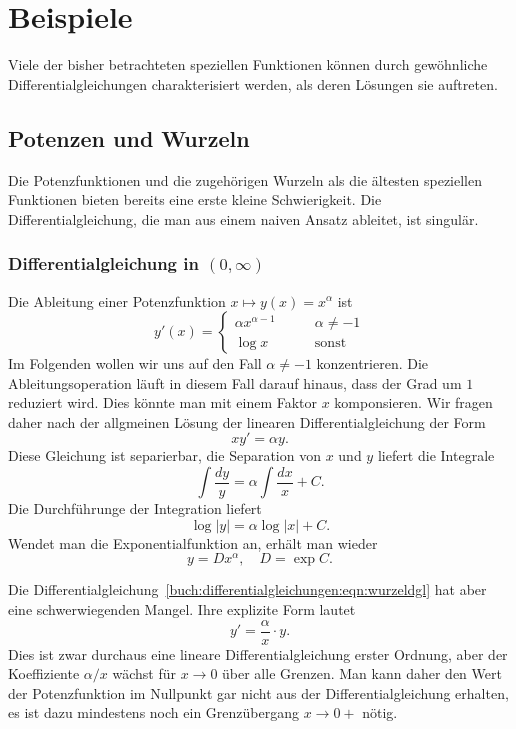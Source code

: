 %
%
%
\section{Beispiele
\label{buch:differentialgleichungen:section:beispiele}}
Viele der bisher betrachteten speziellen Funktionen können 
durch gewöhnliche Differentialgleichungen charakterisiert werden,
als deren Lösungen sie auftreten.

\subsection{Potenzen und Wurzeln
\label{buch:differentialgleichungen:subsection:potenzen-und-wurzeln}}
Die Potenzfunktionen und die zugehörigen Wurzeln als die ältesten
speziellen Funktionen bieten bereits eine erste kleine Schwierigkeit.
Die Differentialgleichung, die man aus einem naiven Ansatz ableitet,
ist singulär.

\subsubsection{Differentialgleichung in $(0,\infty)$}
Die Ableitung einer Potenzfunktion $x\mapsto y(x)=x^\alpha$ ist
\[
y'(x) =
\begin{cases}
\alpha x^{\alpha-1} &\qquad \alpha\ne -1\\
\log x&\qquad\text{sonst}
\end{cases}
\]
Im Folgenden wollen wir uns auf den Fall $\alpha\ne -1$ konzentrieren.
Die Ableitungsoperation läuft in diesem Fall darauf hinaus, dass der
Grad um $1$ reduziert wird.
Dies könnte man mit einem Faktor $x$ komponsieren.
Wir fragen daher nach der allgmeinen Lösung der linearen
Differentialgleichung der Form
\begin{equation}
xy' = \alpha y.
\label{buch:differentialgleichungen:eqn:wurzeldgl}
\end{equation}
Diese Gleichung ist separierbar, die Separation von $x$ und $y$ liefert
die Integrale
\[
\int \frac{dy}{y} = \alpha \int \frac{dx}{x} + C.
\]
Die Durchführunge der Integration liefert 
\[
\log |y| = \alpha \log|x| + C.
\]
Wendet man die Exponentialfunktion an, erhält man wieder
\[
y = Dx^\alpha,\quad D=\exp C.
\]

Die Differentialgleichung~\eqref{buch:differentialgleichungen:eqn:wurzeldgl}
hat aber eine schwerwiegenden Mangel.
Ihre explizite Form lautet
\begin{equation}
y' = \frac{\alpha}{x}\cdot y.
\label{buch:differentialgleichungen:eqn:wurzelsing}
\end{equation}
Dies ist zwar durchaus eine lineare Differentialgleichung erster Ordnung,
aber der Koeffiziente $\alpha/x$ wächst für $x\to 0$ über alle Grenzen.
Man kann daher den Wert der Potenzfunktion im Nullpunkt gar nicht aus der
Differentialgleichung erhalten, es ist dazu mindestens noch ein Grenzübergang
$x\to 0+$ nötig.

